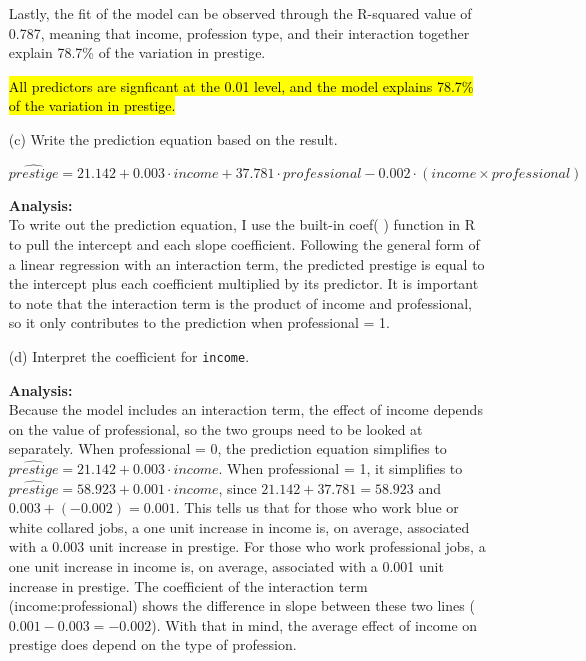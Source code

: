 \documentclass[12pt,letterpaper]{article}
\begin{document}
\begin{enumerate}
	Lastly, the fit of the model can be observed through the R-squared value of 0.787, meaning that income, profession type, and their interaction together explain 78.7\% of the variation in prestige. 
	
	\hl{All predictors are signficant at the 0.01 level, and the model explains 78.7\% of the variation in prestige.}
	
	\item [(c)]
	Write the prediction equation based on the result.
	
	
	
	\begin{equation*}
		\widehat{prestige} = 21.142 + 0.003 \cdot income + 37.781 \cdot professional - 0.002 \cdot (income \times professional)
	\end{equation*}
	
	\textbf{Analysis:}\\
	To write out the prediction equation, I use the built-in coef( ) function in R to pull the intercept and each slope coefficient. Following the general form of a linear regression with an interaction term, the predicted prestige is equal to the intercept plus each coefficient multiplied by its predictor. It is important to note that the interaction term is the product of income and professional, so it only contributes to the prediction when professional = 1. 
	
	\item [(d)]
	Interpret the coefficient for \texttt{income}.
	
	\textbf{Analysis:}\\
	Because the model includes an interaction term, the effect of income depends on the value of professional, so the two groups need to be looked at separately. When professional = 0, the prediction equation simplifies to $\widehat{prestige} = 21.142 + 0.003 \cdot income$. When professional = 1, it simplifies to $\widehat{prestige} = 58.923 + 0.001 \cdot income$, since $21.142 + 37.781 = 58.923$ and $0.003 + (-0.002) = 0.001$. This tells us that for those who work blue or white collared jobs, a one unit increase in income is, on average, associated with a 0.003 unit increase in prestige. For those who work professional jobs, a one unit increase in income is, on average, associated with a 0.001 unit increase in prestige. The coefficient of the interaction term (income:professional) shows the difference in slope between these two lines ($0.001 - 0.003 = -0.002$). With that in mind, the average effect of income on prestige does depend on the type of profession.
	

\end{enumerate}
\end{document}
